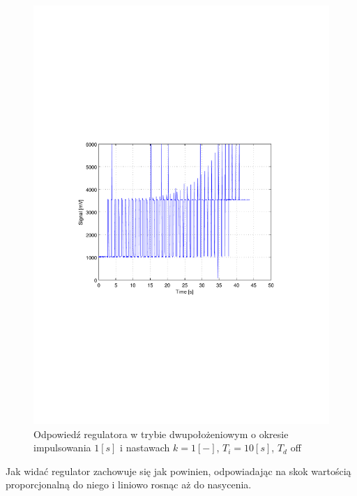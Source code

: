 \documentclass[12pt]{article}
\begin{document}
\begin{figure}[!htb]
	\begin{center}
		\includegraphics[width=12cm,trim=3cm 9cm 3cm 9cm,clip]
		{../res/img/dis_1_10_0.pdf}
	\end{center} 
	\caption{Odpowiedź regulatora w trybie dwupołożeniowym o okresie impulsowania
	$1[s]$ i nastawach $k=1[-]$, $T_i=10[s]$, $T_d$ off}
\end{figure}

Jak widać regulator zachowuje się jak powinien, odpowiadając na skok wartością
proporcjonalną do niego i liniowo rosnąc aż do nasycenia.
\end{document}
